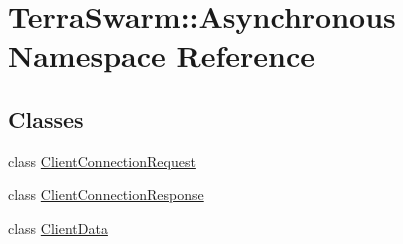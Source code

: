 \hypertarget{namespace_terra_swarm_1_1_asynchronous}{\section{Terra\-Swarm\-:\-:Asynchronous Namespace Reference}
\label{namespace_terra_swarm_1_1_asynchronous}
}
\subsection*{Classes}
\begin{DoxyCompactItemize}
\item 
class \hyperlink{class_terra_swarm_1_1_asynchronous_1_1_client_connection_request}{Client\-Connection\-Request}
\item 
class \hyperlink{class_terra_swarm_1_1_asynchronous_1_1_client_connection_response}{Client\-Connection\-Response}
\item 
class \hyperlink{class_terra_swarm_1_1_asynchronous_1_1_client_data}{Client\-Data}
\end{DoxyCompactItemize}
